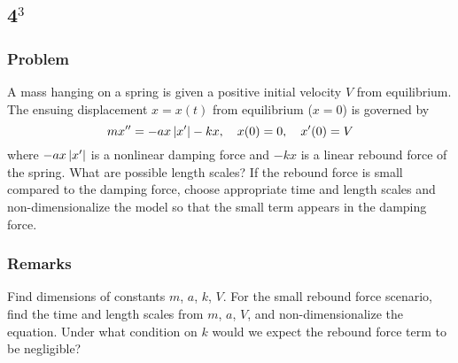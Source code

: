 \documentclass[12pt,twoside]{article}
\begin{document}

\subsection{4$^3$}
\subsubsection*{Problem}
A mass hanging on a spring is given a positive initial velocity $V$ from
equilibrium. The ensuing displacement $x=x(t)$ from equilibrium ($x=0$) is
governed by
\begin{equation}
  \label{eq:4-problem}
  mx'' = -ax\left|{x'}\right|-kx, \quad x(0) = 0,\quad x'(0) = V
\end{equation}
where $-ax\left|{x'}\right|$ is a nonlinear damping force and $-kx$ is a linear rebound
force of the spring. What are possible length scales? If the rebound force is
small compared to the damping force, choose appropriate time and length scales
and non-dimensionalize the model so that the small term appears in the damping
force.

\subsubsection*{Remarks}
Find dimensions of constants $m$, $a$, $k$, $V$. For the small rebound force
scenario, find the time and length scales from $m$, $a$, $V$, and
non-dimensionalize the equation. Under what condition on $k$ would we expect the
rebound force term to be negligible?
\end{document}
